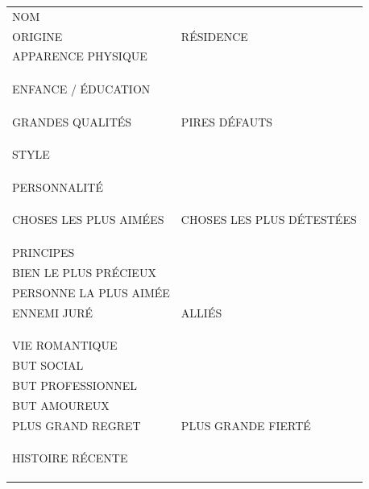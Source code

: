 \documentclass[a5paper]{letter}
\begin{document}
{{{{\begin{tabular}[c]{ p{} p{} }
	NOM						&									\\
	ORIGINE					&		RÉSIDENCE					\\
	APPARENCE PHYSIQUE		&									\\
							&									\\
							&									\\
							&									\\
	ENFANCE / ÉDUCATION		&									\\
							&									\\
							&									\\
							&									\\
	GRANDES QUALITÉS		&		PIRES DÉFAUTS				\\
							&									\\
							&									\\
							&									\\
	STYLE					&									\\
							&									\\
							&									\\
							&									\\
	PERSONNALITÉ			&									\\
							&									\\
							&									\\
							&									\\
	CHOSES LES PLUS AIMÉES	&		CHOSES LES PLUS DÉTESTÉES	\\
							&									\\
							&									\\
							&									\\
	PRINCIPES				&									\\
	BIEN LE PLUS PRÉCIEUX	&									\\
	PERSONNE LA PLUS AIMÉE	&									\\
	ENNEMI JURÉ				&		ALLIÉS						\\
							&									\\
							&									\\
							&									\\
	VIE ROMANTIQUE			&									\\
	BUT SOCIAL				&									\\
	BUT PROFESSIONNEL		&									\\
	BUT AMOUREUX			&									\\
	PLUS GRAND REGRET		&		PLUS GRANDE FIERTÉ			\\
							&									\\
							&									\\
							&									\\
	HISTOIRE RÉCENTE		&									\\
							&									\\
							&									\\
							&									\\
\end{tabular}

}}}}
\end{document}
